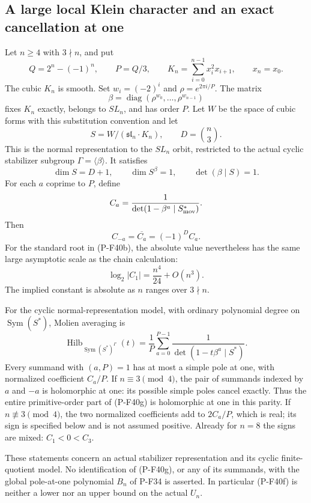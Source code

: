 \subsection{A large local Klein character and an exact cancellation at one}

\begin{proposition}
\label{prop:kleinphase}
Let $n\ge4$ with $3\nmid n$, and put
\[
 Q=2^n-(-1)^n,\qquad P=Q/3,\qquad
 K_n=\sum_{i=0}^{n-1}x_i^2x_{i+1},\qquad x_n=x_0.
 \tag{P-F40a}
\]
The cubic $K_n$ is smooth. Set $w_i=(-2)^i$ and
$\rho=e^{2\pi i/P}$. The matrix
\[
 \beta=\operatorname{diag}(\rho^{w_0},\ldots,\rho^{w_{n-1}})
 \tag{P-F40b}
\]
fixes $K_n$ exactly, belongs to $SL_n$, and has order $P$.
Let $W$ be the space of cubic forms with this substitution
convention and let
\[
 S=W/(\mathfrak{sl}_n\cdot K_n),\qquad D=\binom n3.
 \tag{P-F40c}
\]
This is the normal representation to the $SL_n$ orbit, restricted
to the actual cyclic stabilizer subgroup $\Gamma=\langle\beta\rangle$.
It satisfies
\[
 \dim S=D+1,\qquad\dim S^\beta=1,\qquad
 \det(\beta\mid S)=1.
 \tag{P-F40d}
\]
For each $a$ coprime to $P$, define
\[
 C_a=\frac1{\det(1-\beta^a\mid S^*_{\rm mov})}.
\]
Then
\[
                 C_{-a}=\overline{C_a}=(-1)^D C_a.
 \tag{P-F40e}
\]
For the standard root in (P-F40b), the absolute value nevertheless
has the same large asymptotic scale as the chain calculation:
\[
                         \log_2|C_1|=\frac{n^4}{24}+O(n^3).
 \tag{P-F40f}
\]
The implied constant is absolute as $n$ ranges over $3\nmid n$.

For the cyclic normal-representation model, with ordinary
polynomial degree on $\operatorname{Sym}(S^*)$, Molien averaging is
\[
 \operatorname{Hilb}_{\operatorname{Sym}(S^*)^\Gamma}(t)
       =\frac1P\sum_{a=0}^{P-1}
                       \frac1{\det(1-t\beta^a\mid S^*)}.
 \tag{P-F40g}
\]
Every summand with $(a,P)=1$ has at most a simple pole at one,
with normalized coefficient $C_a/P$.
If $n\equiv3\pmod4$, the pair of summands indexed by $a$ and
$-a$ is holomorphic at one: its possible simple poles cancel
exactly. Thus the entire primitive-order part of (P-F40g)
is holomorphic at one in this parity. If $n\not\equiv3\pmod4$,
the two normalized coefficients add to $2C_a/P$, which is real;
its sign is specified below and is not assumed positive.
Already for $n=8$ the signs are mixed: $C_1<0<C_3$.

These statements concern an actual stabilizer representation
and its cyclic finite-quotient model. No identification of
(P-F40g), or any of its summands, with the global pole-at-one
polynomial $B_n$ of P-F34 is asserted. In particular (P-F40f)
is neither a lower nor an upper bound on the actual $U_n$.
\end{proposition}

